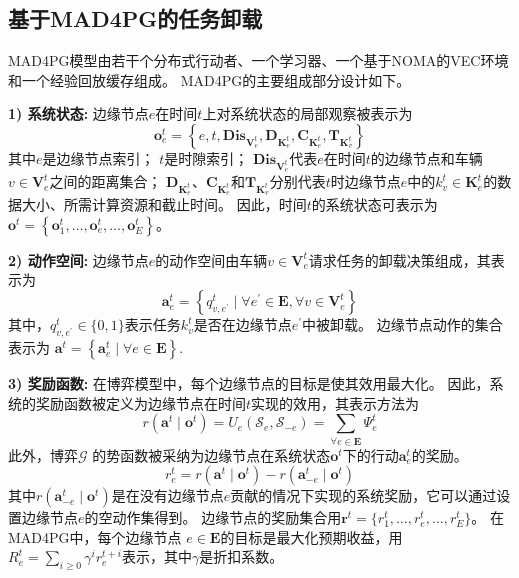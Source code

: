 \subsection{基于MAD4PG的任务卸载}
MAD4PG模型由若干个分布式行动者、一个学习器、一个基于NOMA的VEC环境和一个经验回放缓存组成。
MAD4PG的主要组成部分设计如下。

\textbf{1) 系统状态:} 边缘节点$e$在时间$t$上对系统状态的局部观察被表示为
	\begin{equation}
		\boldsymbol{o}_{e}^{t}=\left\{e, t, \mathbf{Dis}_{\mathbf{V}_{e}^{t}}, \mathbf{D}_{\mathbf{K}_{e}^{t}}, \mathbf{C}_{\mathbf{K}_{e}^{t}}, \mathbf{T}_{\mathbf{K}_{v}^{t}}\right\}
	\end{equation} 
	\noindent 其中$e$是边缘节点索引；
	$t$是时隙索引；
	$\mathbf{Dis}_{\mathbf{V}_{e}^{t}}$代表$e$在时间$t$的边缘节点和车辆$v \in \mathbf{V}_{e}^{t}$之间的距离集合；
	$\mathbf{D}_{\mathbf{K}_{e}^{t}}$、$\mathbf{C}_{\mathbf{K}_{e}^{t}}$和$\mathbf{T}_{\mathbf{K}_{v}^{t}}$分别代表$t$时边缘节点$e$中的$k_{v}^{t} \in \mathbf{K}_{e}^{t}$的数据大小、所需计算资源和截止时间。
	因此，时间$t$的系统状态可表示为$\boldsymbol{o}^{t}=\left\{\boldsymbol{o}_{1}^{t}, \ldots, \boldsymbol{o}_{e}^{t}, \ldots, \boldsymbol{o}_{E}^{t}\right\}$。

\textbf{2) 动作空间:} 边缘节点$e$的动作空间由车辆$v \in \mathbf{V}_{e}^{t}$请求任务的卸载决策组成，其表示为
	\begin{equation}
		\boldsymbol{a}_{e}^{t} = \left\{ q_{v, e^{\prime}}^t \mid \forall e^{\prime} \in \mathbf{E}, \forall v \in \mathbf{V}_{e}^{t} \right\}
	\end{equation}
	\noindent 其中，$q_{v, e^{\prime}}^t \in \{0, 1\}$表示任务$k_{v}^t$是否在边缘节点$e^{\prime}$中被卸载。
	边缘节点动作的集合表示为 $\boldsymbol{a}^{t} = \left\{\boldsymbol{a}_{e}^{t}\mid \forall e \in \mathbf{E} \right\}$.
	
\textbf{3) 奖励函数:} 在博弈模型中，每个边缘节点的目标是使其效用最大化。
	因此，系统的奖励函数被定义为边缘节点在时间$t$实现的效用，其表示方法为
	\begin{equation}
		r\left(\boldsymbol{a}^{t} \mid \boldsymbol{o}^{t}\right)= {U}_{e}\left(\mathcal{S}_{e}, \mathcal{S}_{-e}\right) = \sum_{\forall e \in \mathbf{E}} \Psi_{e}^{t}
		\label{equ 4-32}
	\end{equation}
	此外，博弈$\mathcal{G}$ 的势函数被采纳为边缘节点在系统状态$\boldsymbol{o}^{t}$下的行动$\boldsymbol{a}_{e}^{t}$的奖励。
	\begin{equation}
		r_{e}^{t} = r\left(\boldsymbol{a}^{t} \mid \boldsymbol{o}^{t}\right)-r\left(\boldsymbol{a}_{-e}^{t} \mid \boldsymbol{o}^{t}\right)
		\label{equ 4-33}
	\end{equation}
	\noindent 其中$r\left(\boldsymbol{a}_{-e}^{t} \mid \boldsymbol{o}^{t}\right)$是在没有边缘节点$e$贡献的情况下实现的系统奖励，它可以通过设置边缘节点$e$的空动作集得到。
	边缘节点的奖励集合用$\boldsymbol{r}^{t} = \{r_{1}^{t}, \ldots, r_{e}^{t}, \ldots, r_{E}^{t}\}$。
	在MAD4PG中，每个边缘节点 $e \in \mathbf{E}$的目标是最大化预期收益，用$R_{e}^{t} = \sum_{i \geq 0} \gamma^{i} r_{e}^{t+i}$表示，其中$\gamma$是折扣系数。

